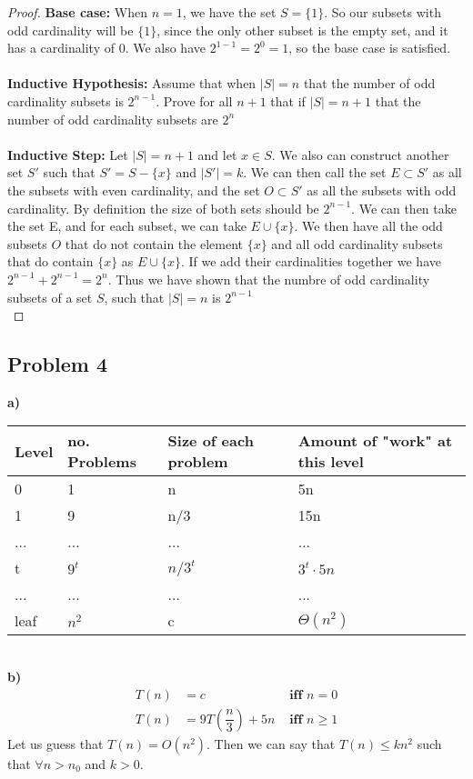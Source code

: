 \documentclass[12pt]{article}
\begin{document}
\begin{proof}
\textbf{Base case:} When $n = 1$, we have the set $S = \{ 1 \}$. So our subsets with odd cardinality will be $\{1\}$, since the only other subset is the empty set, and it has a cardinality of 0. We also have $2^{1 - 1} = 2^{0} = 1$, so the base case is satisfied.\\\\
\textbf{Inductive Hypothesis:} Assume that when $|S| = n$ that the number of odd cardinality subsets is $2^{n-1}$. Prove for all $n+1$ that if $|S| = n+1$ that the number of odd cardinality subsets are $2^{n}$\\\\
\textbf{Inductive Step:} Let $|S| = n+1$ and let $x \in S$. We also can construct another set $S'$ such that $S' = S - \{x\}$ and $|S'| = k$. We can then call the set $E \subset S'$ as all the subsets with even cardinality, and the set $O \subset S'$ as all the subsets with odd cardinality. By definition the size of both sets should be $2^{n-1}$. We can then take the set E, and for each subset, we can take $E \cup \{x\}$. We then have all the odd subsets $O$ that do not contain the element $\{x\}$ and all odd cardinality subsets that do contain $\{x\}$ as $E \cup \{x\}$. If we add their cardinalities together we have $2^{n-1} + 2^{n-1} = 2^{n}$. Thus we have shown that the numbre of odd cardinality subsets of a set $S$, such that $|S|=n$ is $2^{n-1}$\\
\end{proof}
\newpage
\subsection*{Problem 4}
\textbf{a)}
\begin{table}[!h]
\centering
\begin{tabular}{|l|l|l|l|}
\hline
Level & no. Problems & Size of each problem & Amount of "work" at this level \\ \hline
0 & 1 & n & 5n \\ \hline
1 & 9 & n/3 & 15n \\ \hline
... & ... & ... & ... \\ \hline
t & $9^t$ & $n/3^t$ & $3^t \cdot 5n$ \\ \hline
... & ... & ... & ... \\ \hline
leaf & $n^2$ & c & $\Theta (n^2)$ \\ \hline
\end{tabular}
\end{table}\\
\textbf{b)}
\begin{align*}
T(n) &= c &\textbf{ iff } n=0\\
T(n) &= 9T(\dfrac{n}{3}) + 5n &\textbf{ iff } n \geq 1
\end{align*}
Let us guess that $T(n) = O(n^2)$. Then we can say that $T(n) \leq kn^2$ such that $\forall n > n_0$ and $k > 0$.\\
\end{document}
